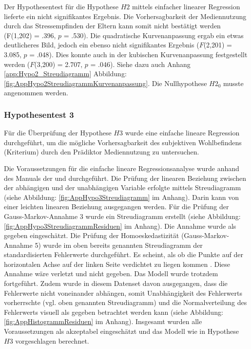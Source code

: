 Der Hypothesentest für die Hypothese $H2$ mittels einfacher linearer Regression lieferte ein nicht signifikantes Ergebnis. Die Vorhersagbarkeit der Mediennutzung durch das Stressempfinden der Eltern kann somit nicht bestätigt werden (F(1,202) = .396, $p$ = .530). Die quadratische Kurvenanpassung ergab ein etwas deutlicheres Bild, jedoch ein ebenso nicht signifikantes Ergebnis ($F$(2,201) = 3.085, $p$ = .048). Dies konnte auch in der kubischen Kurvenanpassung festgestellt werden ($F$(3,200) = 2.707, $p$ = .046). Siehe dazu auch Anhang \ref{app:Hypo2_Streudiagramm} Abbildung: \ref{fig:AppHypo2StreudiagrammKurvenanpassung}. Die Nullhypothese $H2_{0}$ musste angenommen werden.

\subsubsection{Hypothesentest 3}
Für die Überprüfung der Hypothese $H3$ wurde eine einfache lineare Regression durchgeführt, um die mögliche Vorhersagbarkeit des subjektiven Wohlbefindens (Kriterium) durch den Prädiktor Mediennutzung zu untersuchen.

Die Voraussetzungen für die einfache lineare Regressionsanalyse wurde anhand des Manuals der  und  durchgeführt. Die Prüfung der linearen Beziehung zwischen der abhängigen und der unabhängigen Variable erfolgte mittels Streudiagramm (siehe Abbildung: \ref{fig:AppHypo3Streudiagramm} im Anhang). Darin kann von einer leichten linearen Beziehung ausgegangen werden. Für die Prüfung der Gauss-Markov-Annahme 3 wurde ein Streudiagramm erstellt (siehe Abbildung: \ref{fig:AppHypo3StreudiagrammResiduen} im Anhang). Die Annahme wurde als gegeben eingeschätzt. Die Prüfung der Homoeskedastizität (Gauss-Markov-Annahme 5) wurde im oben bereits genannten Streudiagramm der standardisierten Fehlerwerte durchgeführt. Es scheint, als ob die Punkte auf der horizontalen Achse auf der linken Seite verdichtet zu liegen kommen \cite{Hemmerich2018}. Diese Annahme wäre verletzt und nicht gegeben. Das Modell wurde trotzdem fortgeführt. Zudem wurde in diesem Datenset davon ausgegangen, dass die Fehlerwerte nicht voneinander abhängen, somit Unabhängigkeit des Fehlerwerts vorherrschte (vgl. oben genannten Streudiagramm) und die Normalverteilung des Fehlerwerts visuell als gegeben betrachtet werden kann (siehe Abbildung: \ref{fig:AppHistogrammResiduen} im Anhang). Insgesamt wurden alle Voraussetzungen als akzeptabel eingeschätzt und das Modell wie in Hypothese $H3$ vorgeschlagen berechnet.


